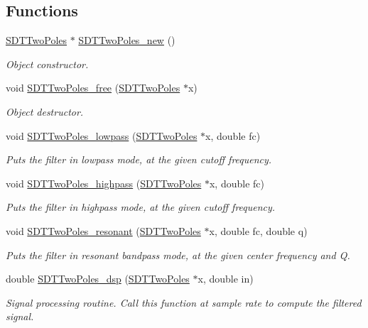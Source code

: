 \subsection*{Functions}
\begin{DoxyCompactItemize}
\item 
\hyperlink{group__twopoles_gab843f82d5b6d8ab18ebdf6f43bf0ad6d}{S\+D\+T\+Two\+Poles} $\ast$ \hyperlink{group__twopoles_gaa74c762508dce666d9fa776946b9f42b}{S\+D\+T\+Two\+Poles\+\_\+new} ()
\begin{DoxyCompactList}\small\item\em Object constructor. \end{DoxyCompactList}\item 
void \hyperlink{group__twopoles_ga5dd05014c4b2a789571624492d682d96}{S\+D\+T\+Two\+Poles\+\_\+free} (\hyperlink{group__twopoles_gab843f82d5b6d8ab18ebdf6f43bf0ad6d}{S\+D\+T\+Two\+Poles} $\ast$x)
\begin{DoxyCompactList}\small\item\em Object destructor. \end{DoxyCompactList}\item 
void \hyperlink{group__twopoles_gafa19c0d5b56bda7d23a9defd94d5896a}{S\+D\+T\+Two\+Poles\+\_\+lowpass} (\hyperlink{group__twopoles_gab843f82d5b6d8ab18ebdf6f43bf0ad6d}{S\+D\+T\+Two\+Poles} $\ast$x, double fc)
\begin{DoxyCompactList}\small\item\em Puts the filter in lowpass mode, at the given cutoff frequency. \end{DoxyCompactList}\item 
void \hyperlink{group__twopoles_gaa82c69d3d5e24fd7e3a97ca2452a2db4}{S\+D\+T\+Two\+Poles\+\_\+highpass} (\hyperlink{group__twopoles_gab843f82d5b6d8ab18ebdf6f43bf0ad6d}{S\+D\+T\+Two\+Poles} $\ast$x, double fc)
\begin{DoxyCompactList}\small\item\em Puts the filter in highpass mode, at the given cutoff frequency. \end{DoxyCompactList}\item 
void \hyperlink{group__twopoles_gadf81cf6cff0122fab17a9d541d42f907}{S\+D\+T\+Two\+Poles\+\_\+resonant} (\hyperlink{group__twopoles_gab843f82d5b6d8ab18ebdf6f43bf0ad6d}{S\+D\+T\+Two\+Poles} $\ast$x, double fc, double q)
\begin{DoxyCompactList}\small\item\em Puts the filter in resonant bandpass mode, at the given center frequency and Q. \end{DoxyCompactList}\item 
double \hyperlink{group__twopoles_ga417ac7f368f84f83496c1ba12a351568}{S\+D\+T\+Two\+Poles\+\_\+dsp} (\hyperlink{group__twopoles_gab843f82d5b6d8ab18ebdf6f43bf0ad6d}{S\+D\+T\+Two\+Poles} $\ast$x, double in)
\begin{DoxyCompactList}\small\item\em Signal processing routine. Call this function at sample rate to compute the filtered signal. \end{DoxyCompactList}\end{DoxyCompactItemize}


